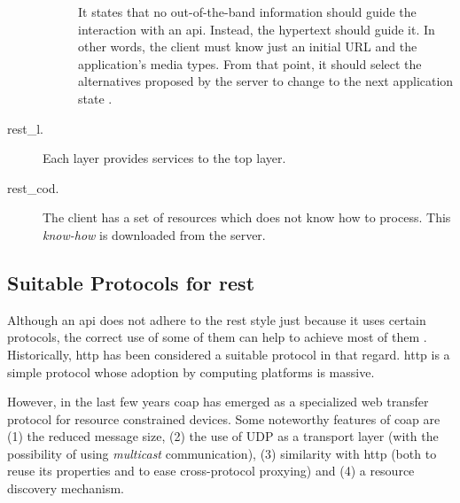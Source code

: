 \begin{description}
\begin{description}
	                           It states that no out-of-the-band information should guide the interaction with an \ac{api}.
	                           Instead, the hypertext should guide it.
	                           In other words, the client must know just an initial URL and the application's media types.
	                           From that point, it should select the alternatives proposed by the server to change to the next application state \citep{fielding_rest_2008}.
    \end{description}
 \item[\acf{rest_l}.] Each layer provides services to the top layer. %
 \item[\acf{rest_cod}.] The client has a set of resources which does not know how to process.
                        This \emph{know-how} is downloaded from the server.
\end{description}


\subsection{Suitable Protocols for \ac{rest}}
\label{sec:protocols}

Although an \ac{api} does not adhere to the \ac{rest} style just because it uses certain protocols,
the correct use of some of them can help to achieve most of them \citep{moore_hypermedia_2010}.
Historically, \acf{http} has been considered a suitable protocol in that regard.
\ac{http} is a simple protocol whose adoption by computing platforms is massive.


However, in the last few years \acf{coap} has emerged as a specialized web transfer protocol for resource constrained devices. %
Some noteworthy features of \ac{coap} are
(1) the reduced message size,
(2) the use of UDP as a transport layer (with the possibility of using \emph{multicast} communication),
(3) similarity with \ac{http} (both to reuse its properties and to ease cross-protocol proxying) and
(4) a resource discovery mechanism. %


